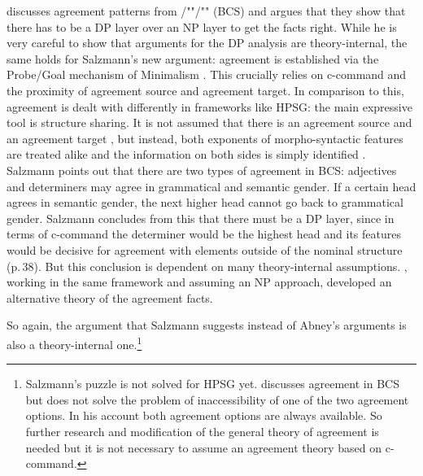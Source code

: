 \documentclass[output=paper
  ,nobabel
  ,draftmode
  ,uniformtopskip %
  ,colorlinks, citecolor=brown
]{langscibook}
\begin{document}
\largerpage
\citet[Section~4.3]{Salzmann2020a} discusses agreement patterns from
/""/"" (BCS) and argues that they show that there has to be a DP layer over an
NP layer to get the facts right. While he is very careful to show that  arguments
for the DP analysis are theory-internal, the same holds for Salzmann's new argument: agreement is
established via the Probe/Goal mechanism of Minimalism \citep{Chomsky2001a-u}. This crucially relies
on c-command and the proximity of agreement source and agreement target. In comparison to this,
agreement is dealt with differently in frameworks like HPSG: the main expressive tool is structure
sharing. It is not assumed that there is an agreement source and an agreement target
\citep[Section~2.2]{ps2}, but instead, both exponents of morpho-syntactic features are treated alike
and the information on both sides is simply identified
\parencites[Chapter~2]{ps2}{Kathol99b}{WZ2003a}{VanEynde2021a}. Salzmann points out that there are
two types of agreement in BCS: adjectives and determiners may agree in grammatical and semantic
gender. If a certain head agrees in semantic gender, the next higher head cannot go back to
grammatical gender. Salzmann concludes from this that there must be a DP layer, since in terms of
c-command the determiner would be the highest head and its features would be decisive for agreement
with elements outside of the nominal structure (p.\,38). But this conclusion is dependent on many
theory-internal assumptions. \citet[Section~4]{Bruening2020a}, working in the same framework and
assuming an NP approach, developed an alternative theory of the agreement facts.

So again, the argument that Salzmann suggests instead of Abney's arguments is also a
theory-internal one.\footnote{
  Salzmann's puzzle is not solved for HPSG yet. \citet{VanEynde2020b} discusses agreement in BCS but
  does not solve the problem of inaccessibility of one of the two agreement options. In his account
  both agreement options are always available. So further research and modification of the general theory of
  agreement is needed but it is not necessary to assume an agreement theory based on c-command.
}
\end{document}
